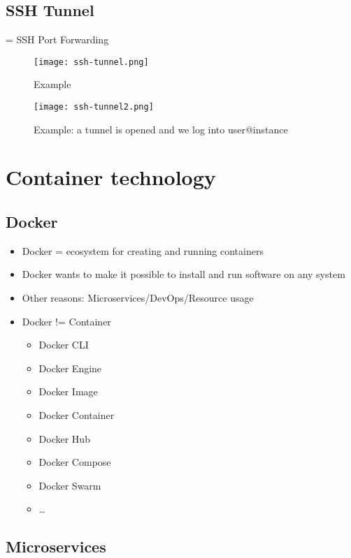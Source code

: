 \documentclass{article}
\begin{document}
\subsection{SSH Tunnel}

= SSH Port Forwarding

\begin{figure}[H]
    \centering
    \texttt{[image: ssh-tunnel.png]}
    \caption{Example}
\end{figure}

\begin{figure}[H]
    \centering
    \texttt{[image: ssh-tunnel2.png]}
    \caption{Example: a tunnel is opened and we log into user@instance}
\end{figure}


\section{Container technology}

\subsection{Docker}

\begin{itemize}
    \item Docker = ecosystem for creating and running containers
    \item Docker wants to make it possible to install and run software on any system
    \item Other reasons: Microservices/DevOps/Resource usage
    \item Docker != Container
    \begin{itemize}
        \item Docker CLI
        \item Docker Engine
        \item Docker Image
        \item Docker Container
        \item Docker Hub
        \item Docker Compose
        \item Docker Swarm
        \item \dots
    \end{itemize}
\end{itemize}

\subsection{Microservices}
\end{document}
